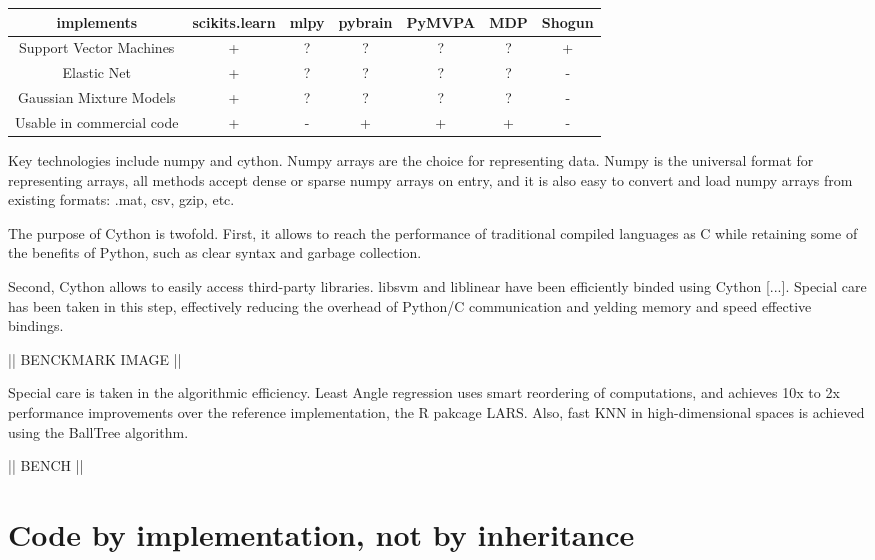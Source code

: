 \documentclass[twoside,11pt]{article}
\begin{document}
\begin{center}


\begin{tabular}{c c c c c c c}
\hline\hline %
implements & scikits.learn & mlpy & pybrain & PyMVPA &  MDP & Shogun \\ [0.5ex]
\hline
Support Vector Machines        & + & ?   & ?       &  ?     & ?    & + \\
Elastic Net & + & ?   & ?       &  ?     & ?    & - \\
Gaussian Mixture Models  & + & ?   & ?       &  ?     & ?    & - \\
Usable in commercial code &  + & -   & +       &  +     & +    & - \\
\hline
\end{tabular}
\end{center}


Key technologies include numpy and cython. Numpy arrays are the choice for
representing data. Numpy is the universal format for representing
arrays, all methods accept dense or sparse numpy arrays on entry, and
it is also easy to convert and load numpy arrays from existing formats:
.mat, csv, gzip, etc.

The purpose of Cython is twofold. First, it allows to reach the
performance of traditional compiled languages as C while retaining
some of the benefits of Python, such as clear syntax and garbage
collection.

Second, Cython allows to easily access third-party libraries. libsvm
and liblinear have been efficiently binded using Cython [...]. Special
care has been taken in this step, effectively reducing the overhead of
Python/C communication and yelding memory and speed effective bindings.


|| BENCKMARK IMAGE ||


Special care is taken in the algorithmic efficiency. Least Angle
regression uses smart reordering of computations, and achieves 10x to
2x performance improvements over the reference implementation, the R
pakcage LARS. Also, fast KNN in high-dimensional spaces is achieved
using the BallTree algorithm.

|| BENCH ||


\section{Code by implementation, not by inheritance}
\end{document}
